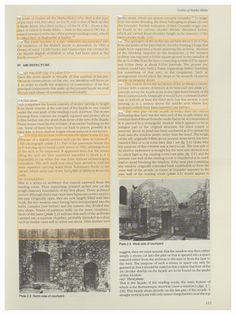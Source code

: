 \begin{figure}[H]
    \centering
    \begin{minipage}[c]{.45\linewidth}
        \centering
        \includegraphics[width=0.9\textwidth]{Images/PLN4.png}
        \label{fig:Q40}
    \end{minipage}\hfill
    \begin{minipage}[c]{.45\linewidth}
        \centering

\end{minipage}
\end{figure}
